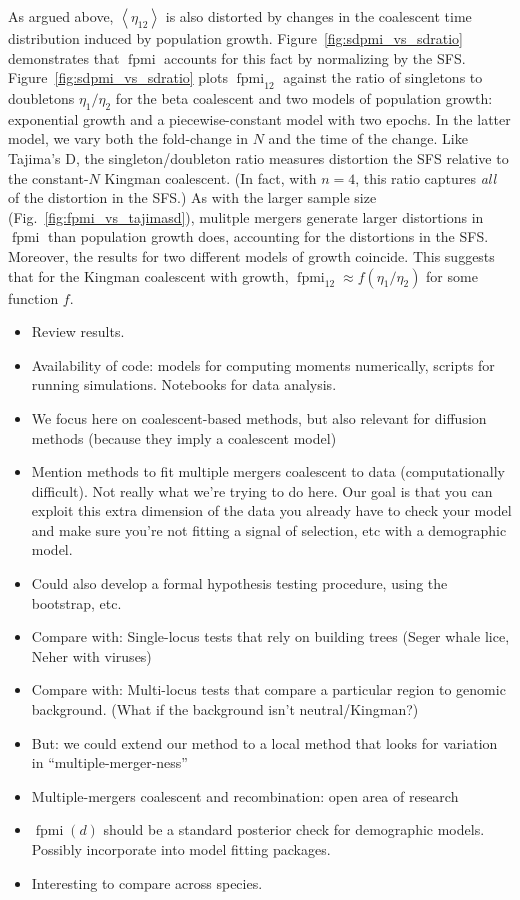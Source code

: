 \documentclass[11pt, letterpaper]{article}   	%
\newcommand{\fig}[1]{Fig.~\ref{#1}}
\newcommand{\Fig}[1]{Figure~\ref{#1}}
\newcommand{\E}[1]{\left< #1 \right>}
\DeclareMathOperator{\fpmi}{fpmi}
\begin{document}
As argued above, $\E{\eta_{12}}$ is also distorted by changes in the coalescent time distribution induced by population growth.
\Fig{fig:sdpmi_vs_sdratio} demonstrates that $\fpmi$ accounts for this fact by normalizing by the SFS.
\Fig{fig:sdpmi_vs_sdratio} plots $\fpmi_{12}$ against the ratio of singletons to doubletons $\eta_1 / \eta_2$ for the beta coalescent and two models of population growth: exponential growth and a piecewise-constant model with two epochs.
In the latter model, we vary both the fold-change in $N$ and the time of the change.
Like Tajima's D, the singleton/doubleton ratio measures distortion the SFS relative to the constant-$N$ Kingman coalescent.
(In fact, with $n=4$, this ratio captures \emph{all} of the distortion in the SFS.)
As with the larger sample size (\fig{fig:fpmi_vs_tajimasd}), mulitple mergers generate larger distortions in $\fpmi$ than population growth does, accounting for the distortions in the SFS.
Moreover, the results for two different models of growth coincide.
This suggests that for the Kingman coalescent with growth, $\fpmi_{12} \approx f(\eta_1/\eta_2)$ for some function $f$.

\begin{itemize}
    \item Review results.
    \item Availability of code: models for computing moments numerically, scripts for running simulations. Notebooks for data analysis.
    \item We focus here on coalescent-based methods, but also relevant for diffusion methods (because they imply a coalescent model)
    \item Mention methods to fit multiple mergers coalescent to data (computationally difficult). Not really what we're trying to do here. Our goal is that you can exploit this extra dimension of the data you already have to check your model and make sure you're not fitting a signal of selection, etc with a demographic model.
    \item Could also develop a formal hypothesis testing procedure, using the bootstrap, etc.
    \item Compare with: Single-locus tests that rely on building trees (Seger whale lice, Neher with viruses)
    \item Compare with: Multi-locus tests that compare a particular region to genomic background. (What if the background isn't neutral/Kingman?)
    \item But: we could extend our method to a local method that looks for variation in ``multiple-merger-ness''
    \item Multiple-mergers coalescent and recombination: open area of research
    \item $\fpmi(d)$ should be a standard posterior check for demographic models. Possibly incorporate into model fitting packages.
    \item Interesting to compare across species.
\end{itemize}
\end{document}
